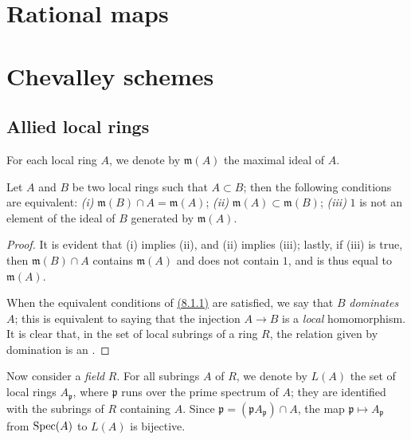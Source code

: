 \section{Rational maps}
\label{section-rational-maps}

\section{Chevalley schemes}
\label{section-chevalley-schemes}

\subsection{Allied local rings}
\label{subsection-allied-local-rings}

For each local ring $A$, we denote by $\mathfrak{m}(A)$ the maximal ideal of
$A$.

\begin{lem}[8.1.1]
\label{lem-1.8.1.1}
Let $A$ and $B$ be two local rings such that $A\subset B$;
then the following conditions are equivalent: {\em (i)}
$\mathfrak{m}(B)\cap A=\mathfrak{m}(A)$; {\em (ii)}
$\mathfrak{m}(A)\subset\mathfrak{m}(B)$; {\em (iii)} $1$ is not an element of
the ideal of $B$ generated by $\mathfrak{m}(A)$.
\end{lem}

\begin{proof}
\label{proof-lem-1.8.1.1}
It is evident that (i) implies (ii), and (ii) implies (iii); lastly, if (iii) is
true, then $\mathfrak{m}(B)\cap A$ contains $\mathfrak{m}(A)$ and does not
contain $1$, and is thus equal to $\mathfrak{m}(A)$.

When the equivalent conditions of \hyperref[lem-1.8.1.1]{(8.1.1)} are satisfied, we say that $B$
{\em dominates} $A$; this is equivalent to saying that the injection $A\to B$
is a {\em local} homomorphism. It is clear that, in the set of local subrings
of a ring $R$, the relation given by domination is an .
\end{proof}

\begin{env}[8.1.2]
\label{env-1.8.1.2}
Now consider a {\em field} $R$. For all subrings $A$ of
$R$, we denote by $L(A)$ the set of local rings $A_\mathfrak{p}$, where
$\mathfrak{p}$ runs over the prime spectrum of $A$; they are identified with the
subrings of $R$ containing $A$. Since
$\mathfrak{p}=(\mathfrak{p}A_\mathfrak{p})\cap A$, the map
$\mathfrak{p}\mapsto A_\mathfrak{p}$ from ${\mathop{\mathrm{Spec}}\nolimits}(A)$ to $L(A)$ is bijective.
\end{env}

